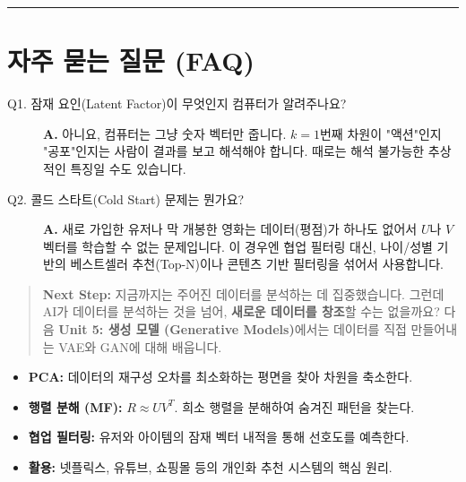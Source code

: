 \documentclass[11pt,a4paper]{book}
\theoremstyle{definition}
\begin{document}
\vspace{0.5cm}\hrule\vspace{0.5cm}

\section{자주 묻는 질문 (FAQ)}

\begin{description}
    \item[Q1. 잠재 요인(Latent Factor)이 무엇인지 컴퓨터가 알려주나요?]
    \textbf{A.} 아니요, 컴퓨터는 그냥 숫자 벡터만 줍니다. $k=1$번째 차원이 "액션"인지 "공포"인지는 사람이 결과를 보고 해석해야 합니다. 때로는 해석 불가능한 추상적인 특징일 수도 있습니다.
    
    \item[Q2. 콜드 스타트(Cold Start) 문제는 뭔가요?]
    \textbf{A.} 새로 가입한 유저나 막 개봉한 영화는 데이터(평점)가 하나도 없어서 $U$나 $V$ 벡터를 학습할 수 없는 문제입니다. 이 경우엔 협업 필터링 대신, 나이/성별 기반의 베스트셀러 추천(Top-N)이나 콘텐츠 기반 필터링을 섞어서 사용합니다.
\end{description}

\vspace{1cm}
\begin{quote}
\textbf{Next Step:} 지금까지는 주어진 데이터를 분석하는 데 집중했습니다. 그런데 AI가 데이터를 분석하는 것을 넘어, \textbf{새로운 데이터를 창조}할 수는 없을까요? 다음 \textbf{Unit 5: 생성 모델 (Generative Models)}에서는 데이터를 직접 만들어내는 VAE와 GAN에 대해 배웁니다.
\end{quote}

\begin{summarybox}[title={Unit 4 (Part B) 핵심 요약}]
\begin{itemize}
    \item \textbf{PCA:} 데이터의 재구성 오차를 최소화하는 평면을 찾아 차원을 축소한다.
    \item \textbf{행렬 분해 (MF):} $R \approx UV^T$. 희소 행렬을 분해하여 숨겨진 패턴을 찾는다.
    \item \textbf{협업 필터링:} 유저와 아이템의 잠재 벡터 내적을 통해 선호도를 예측한다.
    \item \textbf{활용:} 넷플릭스, 유튜브, 쇼핑몰 등의 개인화 추천 시스템의 핵심 원리.
\end{itemize}
\end{summarybox}


\end{document}
